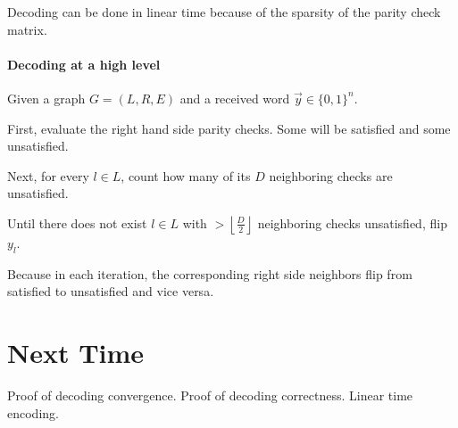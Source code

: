 \documentclass{idc_msc}
\begin{document}
Decoding can be done in linear time because of the sparsity of the parity check matrix.


\paragraph{Decoding at a high level}

Given a graph \(G = (L, R, E)\) and a received word \(\vec{y} \in \{0, 1\}^n\).

First, evaluate the right hand side parity checks. Some will be satisfied and some unsatisfied.

Next, for every \(l \in L\), count how many of its \(D\) neighboring checks are unsatisfied.

Until there does not exist \(l \in L\) with \(> \left\lfloor\frac{D}{2}\right\rfloor\) neighboring checks unsatisfied, flip \(y_l\).

Because in each iteration, the corresponding right side neighbors flip from satisfied to unsatisfied and vice versa.

\section{Next Time}

Proof of decoding convergence.
Proof of decoding correctness.
Linear time encoding.
\end{document}
